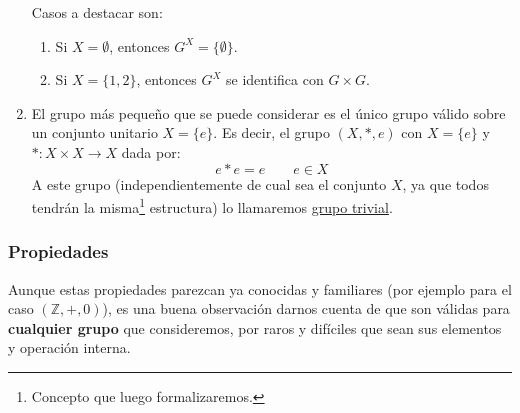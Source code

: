 \begin{ejemplo}
\begin{enumerate}
             Casos a destacar son:
             \begin{enumerate}
                 \item Si $X=\emptyset $, entonces $G^X = \{\emptyset \}$.
                 \item Si $X = \{1,2\}$, entonces $G^X$ se identifica con $G\times G$.
             \end{enumerate}
         \item El grupo más pequeño que se puede considerar es el único grupo válido sobre un conjunto unitario $X=\{e\}$. Es decir, el grupo $(X,\ast,e)$ con $X = \{e\}$ y $\ast:X\times X\rightarrow X$ dada por:
             \begin{equation*}
                 e\ast e = e \qquad e\in X
             \end{equation*}
             A este grupo (independientemente de cual sea el conjunto $X$, ya que todos tendrán la misma\footnote{Concepto que luego formalizaremos.} estructura) lo llamaremos \underline{grupo trivial}.
     \end{enumerate}
\end{ejemplo}

\subsubsection{Propiedades}
Aunque estas propiedades parezcan ya conocidas y familiares (por ejemplo para el caso $(\mathbb{Z},+,0)$), es una buena observación darnos cuenta de que son válidas para \textbf{cualquier grupo} que consideremos, por raros y difíciles que sean sus elementos y operación interna.

